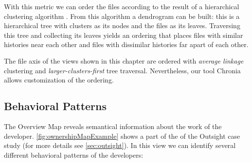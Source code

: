 With this metric we can order the files according to the result of a hierarchical clustering algorithm \cite{Jain99a}. From this algorithm a dendrogram  can be built: this is a hierarchical tree with clusters as its nodes and the files as its leaves. Traversing this tree and collecting its leaves yields an ordering that places files with similar histories near each other and files with dissimilar histories far apart of each other.

The file axis of the \omap views shown in this chapter are ordered with \textit{average linkage} clustering and \textit{larger-clusters-first} tree traversal. Nevertheless, our tool Chronia allows customization of the ordering.

\subsection{Behavioral Patterns}

The Overview Map reveals semantical information about the work of the developer. \autoref{fig:ownershipMapExample} shows a part of the \omap of the Outsight case study (for more details see \autoref{sec:outsight}). In this view we can identify several different behavioral patterns of the developers:

